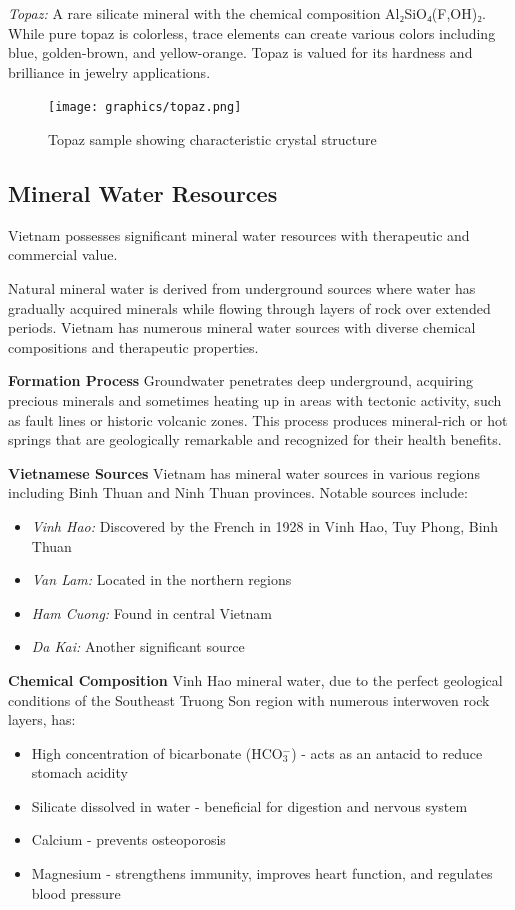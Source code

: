 \textit{Topaz:} A rare silicate mineral with the chemical composition Al₂SiO₄(F,OH)₂. While pure topaz is colorless, trace elements can create various colors including blue, golden-brown, and yellow-orange. Topaz is valued for its hardness and brilliance in jewelry applications.

\begin{figure}[H]
\centering
\texttt{[image: graphics/topaz.png]}
\caption{Topaz sample showing characteristic crystal structure}
\label{fig:topaz}
\end{figure}

\subsection{Mineral Water Resources}

Vietnam possesses significant mineral water resources with therapeutic and commercial value.

Natural mineral water is derived from underground sources where water has gradually acquired minerals while flowing through layers of rock over extended periods. Vietnam has numerous mineral water sources with diverse chemical compositions and therapeutic properties.

\textbf{Formation Process}
Groundwater penetrates deep underground, acquiring precious minerals and sometimes heating up in areas with tectonic activity, such as fault lines or historic volcanic zones. This process produces mineral-rich or hot springs that are geologically remarkable and recognized for their health benefits.

\textbf{Vietnamese Sources}
Vietnam has mineral water sources in various regions including Binh Thuan and Ninh Thuan provinces. Notable sources include:
\begin{itemize}
\item \textit{Vinh Hao:} Discovered by the French in 1928 in Vinh Hao, Tuy Phong, Binh Thuan
\item \textit{Van Lam:} Located in the northern regions
\item \textit{Ham Cuong:} Found in central Vietnam
\item \textit{Da Kai:} Another significant source
\end{itemize}

\textbf{Chemical Composition}
Vinh Hao mineral water, due to the perfect geological conditions of the Southeast Truong Son region with numerous interwoven rock layers, has:
\begin{itemize}
\item High concentration of bicarbonate (HCO$_3^-$) - acts as an antacid to reduce stomach acidity
\item Silicate dissolved in water - beneficial for digestion and nervous system
\item Calcium - prevents osteoporosis
\item Magnesium - strengthens immunity, improves heart function, and regulates blood pressure
\end{itemize}

